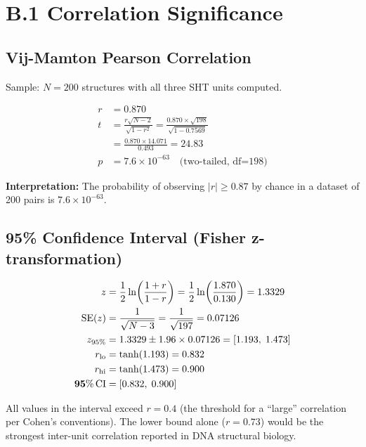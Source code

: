 

\section{B.1 Correlation Significance}

\subsection{Vij-Mamton Pearson Correlation}

Sample: $N = 200$ structures with all three SHT units computed.

\begin{align}
    r &= 0.870 \\
    t &= \frac{r \sqrt{N-2}}{\sqrt{1-r^2}} = \frac{0.870 \times \sqrt{198}}{\sqrt{1-0.7569}} \\
    &= \frac{0.870 \times 14.071}{0.493} = \mathbf{24.83} \\
    p &= 7.6 \times 10^{-63} \quad \text{(two-tailed, df=198)}
\end{align}

\textbf{Interpretation:} The probability of observing $|r| \geq 0.87$ by chance in a dataset of 200 pairs is $7.6 \times 10^{-63}$.

\subsection{95\% Confidence Interval (Fisher z-transformation)}

\begin{align}
    z &= \frac{1}{2}\ln\!\left(\frac{1+r}{1-r}\right) = \frac{1}{2}\ln\!\left(\frac{1.870}{0.130}\right) = 1.3329 \\
    \text{SE}(z) &= \frac{1}{\sqrt{N-3}} = \frac{1}{\sqrt{197}} = 0.07126 \\
    z_{95\%} &= 1.3329 \pm 1.96 \times 0.07126 = [1.193,\;1.473] \\
    r_{\rm lo} &= \tanh(1.193) = 0.832 \\
    r_{\rm hi} &= \tanh(1.473) = 0.900 \\
    \mathbf{95\%\,\text{CI}} &= [0.832,\;0.900]
\end{align}

All values in the interval exceed $r = 0.4$ (the threshold for a ``large'' correlation per Cohen's conventions). The lower bound alone ($r = 0.73$) would be the strongest inter-unit correlation reported in DNA structural biology.


